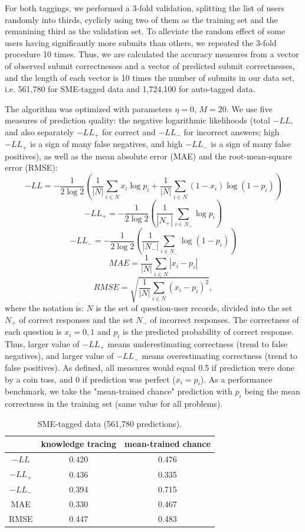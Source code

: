 \documentclass{sigchi}
\newcommand{\1}{\mathbf{1}}
\newcommand{\be}{\begin{equation}}
\newcommand{\ee}{\end{equation}}
\begin{document}
For both taggings, we performed a 3-fold validation, splitting the list of users randomly into thirds, cyclicly using two of them as the training set and the remanining third as the validation set. To alleviate the random effect of some users having significantly more submits than others, we repeated the 3-fold procedure 10 times. Thus, we are calculated the accuracy measures from a vector of observed submit correctnesses and a vector of predicted submit correctnesses, and the length of each vector is 10 times the number of submits in our data set, i.e. 561,780 for SME-tagged data and 1,724,100 for auto-tagged data.

The algorithm was optimized with parameters $\eta=0$, $M=20$. We use five measures of prediction quality: the negative logarithmic likelihoods (total $-LL$, and also separately $-LL_{+}$ for correct and $-LL_{-}$ for incorrect answers; high $-LL_{+}$ is a sign of many false negatives, and high $-LL_{-}$ is a sign of many false positives), as well as the mean absolute error (MAE) and the root-mean-square error (RMSE):
\be -LL=-\frac{1}{2\log 2}\left(\frac{1}{|N|}\sum_{i\in N}x_i\log p_i +\frac{1}{|N|}\sum_{i\in N}(1-x_i)\log (1-p_i)\right)\ee
\be -LL_{+}=-\frac{1}{2\log 2}\left(\frac{1}{|N_+|}\sum_{i\in N_+}\log p_i\right)\ee
\be -LL_{-}=-\frac{1}{2\log 2}\left(\frac{1}{|N_-|}\sum_{i\in N_-}\log (1-p_i)\right)\ee
\be MAE=\frac{1}{|N|}\sum_{i\in N}|x_i-p_i|\ee
\be RMSE=\sqrt{\frac{1}{|N|}\sum_{i\in N}(x_i-p_i)^2},\ee
where the notation is: $N$ is the set of question-user records, divided into the set $N_+$ of correct responses and the set $N_-$ of incorrect responses. The correctness of each question is $x_i=0,1$ and $p_i$ is the predicted probability of correct response. Thus, larger value of $-LL_{+}$ means underestimating correctness (trend to false negatives), and larger value of $-LL_{-}$ means overestimating correctness (trend to false positives). As defined, all measures would equal 0.5 if prediction were done by a coin toss, and 0 if prediction was perfect ($x_i=p_i$). As a performance benchmark, we take the "mean-trained chance" prediction with $p_i$ being the mean correctness in the training set (same value for all problems).


\begin{table}[ht]
\caption{SME-tagged data (561,780 predictions).}
\centering
\begin{tabular}{c c c}
\hline\hline
  & knowledge tracing & mean-trained chance\\ [0.5ex] %
\hline
$-LL$ & 0.420 & 0.476 \\
$-LL_{+}$ & 0.436 & 0.335 \\
$-LL_{-}$ & 0.394 & 0.715 \\
MAE & 0.330 & 0.467 \\
RMSE & 0.447 & 0.483 \\ [1ex]
\hline
\end{tabular}
\label{tablesme}
\end{table}
\end{document}
